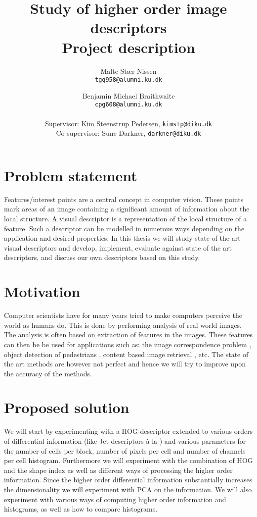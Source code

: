 \documentclass[11pt,a4paper]{article}
\title{\bfseries{Study of higher order image descriptors}\\Project description}
\author{
    Malte Stær Nissen \\\texttt{tgq958@alumni.ku.dk}
    \and
    Benjamin Michael Braithwaite \\ \texttt{cpg608@alumni.ku.dk}
    \\
    \\ \small{Supervisor: Kim Steenstrup Pedersen, \texttt{kimstp@diku.dk}}
    \\ \small{Co-supervisor: Sune Darkner, \texttt{darkner@diku.dk}}
    }
\begin{document}
\maketitle

\section{Problem statement}
Features/interest points are a central concept in computer vision. These
points mark areas of an image containing a significant amount of information
about the local structure. A visual descriptor is a representation of the
local structure of a feature. Such a descriptor can be modelled in numerous
ways depending on the application and desired properties. In this thesis we
will study state of the art visual descriptors and develop, implement, evaluate
against state of the art descriptors,
and discuss our own descriptors based on this study.

\section{Motivation}
Computer scientists have for many years tried to make computers perceive
the world as humans do. This is done by performing analysis of real world
images. The analysis is often based on extraction of features in the images.
These features can then be be used for applications such as: the image
correspondence problem \cite{dahl2011finding}, object detection of pedestrians
\cite{felzenszwalb2008discriminatively}, content based image retrieval
\cite{smeulders2000content}, etc. The state of the art methods are however not
perfect and hence we will try to improve upon the accuracy of the methods.

\section{Proposed solution}
We will start by experimenting with a HOG descriptor extended to
various orders of differential information (like Jet descriptors à la
\cite{larsen2012jet}) and various parameters for the number of cells per
block, number of pixels per cell and number of channels per cell histogram.
Furthermore we will experiment with the combination of HOG and the shape
index \cite{koenderink1992surface} as well as different ways of processing
the higher order information. Since the higher order differential information
substantially increases the dimensionality we will experiment with PCA on the
information. We will also experiment with various ways of computing higher
order information and histograms, as well as how to compare histograms.
\end{document}
